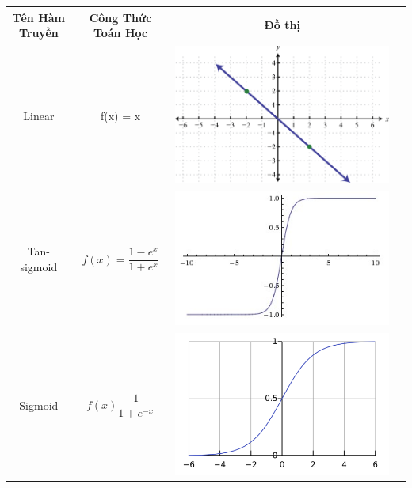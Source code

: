 \begin{table}[!htp]
    \centering
    \begin{tabular}{|c|c|c|c|}
        \hline 
		\textbf{Tên Hàm Truyền}  & \textbf{Công Thức Toán Học} & \textbf{Đồ thị}\\ 
		\hline 
		Linear & f(x) = x  &  \includegraphics[scale=1]{linear} \\
		\hline 
		Tan-sigmoid & $ f(x) = \dfrac{ 1 - e^{x}}{1 + e^{x} } $ & \includegraphics[scale=.5]{tan} \\
		\hline
		Sigmoid & $f(x)  \dfrac {1}{1 + e ^{-x} } $ & \includegraphics[scale=.15 ]{sig} \\

\end{tabular}
\end{table}
